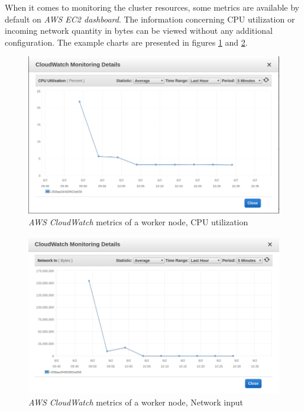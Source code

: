 When it comes to monitoring the cluster resources, some metrics are available by default on \textit{AWS EC2 dashboard}. The information concerning CPU utilization or incoming network quantity in bytes can be viewed without any additional configuration. The example charts are presented in figures \ref{fig:k8s-kops-metrics-node1} and \ref{fig:k8s-kops-metrics-node2}.
\begin{figure}[H]
    \centering
    \includegraphics[width=15cm]{figures/k8s-kops-metrics-node1.png}
    \captionsetup{justification=centering,margin=2cm}
    \caption{\textit{AWS CloudWatch} metrics of a worker node, CPU utilization}
    \label{fig:k8s-kops-metrics-node1}
\end{figure}
\begin{figure}[H]
    \centering
    \includegraphics[width=15cm]{figures/k8s-kops-metrics-node2.png}
    \caption{\textit{AWS CloudWatch} metrics of a worker node, Network input}
    \label{fig:k8s-kops-metrics-node2}
\end{figure}

